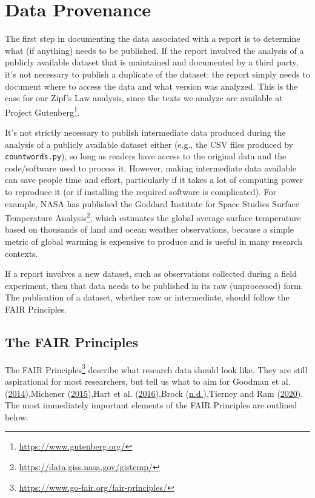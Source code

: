 \documentclass[
]{krantz}
\renewcommand{\href}[2]{#2\footnote{\url{#1}}}
\begin{document}
\hypertarget{provenance-data}{%
\section{Data Provenance}\label{provenance-data}}

The first step in documenting the data associated with a report
is to determine what (if anything) needs to be published.
If the report involved the analysis of a publicly available dataset
that is maintained and documented by a third party,
it's not necessary to publish a duplicate of the dataset:
the report simply needs to document where to access the data
and what version was analyzed.
This is the case for our Zipf's Law analysis,
since the texts we analyze are available at \href{https://www.gutenberg.org/}{Project Gutenberg}.

It's not strictly necessary to publish intermediate data
produced during the analysis of a publicly available dataset either
(e.g., the CSV files produced by \texttt{countwords.py}),
so long as readers have access to the original data and the code/software used to process it.
However,
making intermediate data available can save people time and effort,
particularly if it takes a lot of computing power to reproduce it
(or if installing the required software is complicated).
For example,
NASA has published
the \href{https://data.giss.nasa.gov/gistemp/}{Goddard Institute for Space Studies Surface Temperature Analysis},
which estimates the global average surface temperature
based on thousands of land and ocean weather observations,
because a simple metric of global warming is expensive to produce
and is useful in many research contexts.

If a report involves a new dataset,
such as observations collected during a field experiment,
then that data needs to be published in its raw (unprocessed) form.
The publication of a dataset,
whether raw or intermediate,
should follow the FAIR Principles.

\hypertarget{provenance-data-fair}{%
\subsection{The FAIR Principles}\label{provenance-data-fair}}

The \href{https://www.go-fair.org/fair-principles/}{FAIR Principles} describe what research data should look like.
They are still aspirational for most researchers,
but tell us what to aim for Goodman et al. (\protect\hyperlink{ref-Good2014}{2014}),Michener (\protect\hyperlink{ref-Mich2015}{2015}),Hart et al. (\protect\hyperlink{ref-Hart2016}{2016}),Brock (\protect\hyperlink{ref-Broc2019}{n.d.}),Tierney and Ram (\protect\hyperlink{ref-Tier2020}{2020}).
The most immediately important elements of the FAIR Principles are outlined below.
\end{document}
